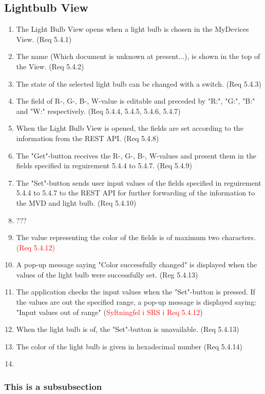 \documentclass[a4paper]{article}
\newlength{\testlabellength}
\newenvironment{testlist}{\begin{enumerate}[label=\bfseries Test \thesubsection.\arabic* , labelindent=0pt, labelwidth=\testlabellength , leftmargin=2cm]}{\end{enumerate}}
\begin{document}
\begin{appendices}
\subsection{Lightbulb View}
\begin{testlist}
	\item The Light Bulb View opens when a light bulb is chosen in the MyDevices View. (Req 5.4.1)
    \item The name (Which document is unknown at present...), is shown in the top of the View. (Req 5.4.2)
    \item The state of the selected light bulb can be changed with a switch. (Req 5.4.3)
    \item The field of R-, G-, B-, W-value is editable and preceded by "R:", "G:", "B:" and "W:" respectively. (Req 5.4.4, 5.4.5, 5.4.6, 5.4.7) 
    \item When the Light Bulb View is opened, the fields are set according to the information from the REST API. (Req 5.4.8)
    \item The "Get"-button receives the R-, G-, B-, W-values and present them in the fields specified in reguirement 5.4.4 to 5.4.7. (Req 5.4.9)
    \item The "Set"-button sends user input values of the fields specified in reguirement 5.4.4 to 5.4.7 to the REST API for further forwarding of the information to the MVD and light bulb. (Req 5.4.10)
    \item ???
    \item The value representing the color of the fields is of maximum two characters. \textcolor{red}{(Req 5.4.12)}
    \item A pop-up message saying "Color successfully changed" is displayed when the values of the light bulb were successfully set. (Reg 5.4.13)
    \item The application checks the input values when the "Set"-button is pressed. If the values are out the specified range, a pop-up message is displayed saying: "Input values out of range" (\textcolor{red}{Syftningfel i SRS i Req 5.4.12})
    \item When the light bulb is of, the "Set"-button is unavailable. (Req 5.4.13)
    \item The color of the light bulb is given in hexadecimal number (Req 5.4.14)
    \item 
\end{testlist}	

\subsubsection{This is a subsubsection}


\end{appendices}
\end{document}
